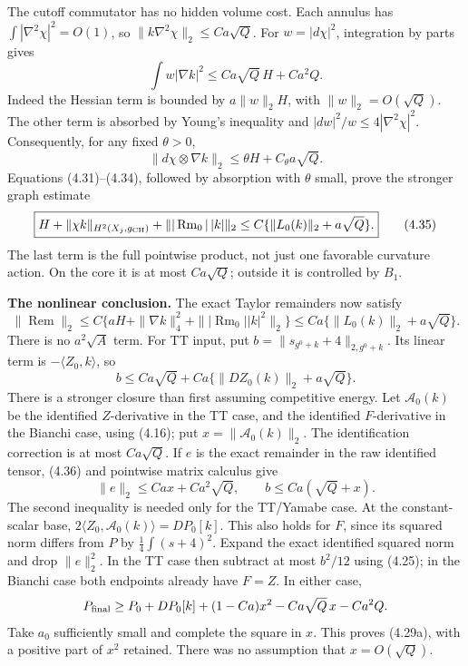 \documentclass[
  11pt,
]{article}
\begin{document}
The cutoff commutator has no hidden volume cost. Each annulus has
\(\int|\nabla^2\chi|^2=O(1)\), so \(\|k\nabla^2\chi\|_2\le Ca\sqrt Q\).
For \(w=|d\chi|^2\), integration by parts gives \[
 \int w|\nabla k|^2
 \le Ca\sqrt Q\,H+Ca^2Q. \tag{4.34}
\] Indeed the Hessian term is bounded by \(a\|w\|_2H\), with
\(\|w\|_2=O(\sqrt Q)\). The other term is absorbed by Young's inequality
and \(|dw|^2/w\le4|\nabla^2\chi|^2\). Consequently, for any fixed
\(\theta>0\), \[
 \|d\chi\otimes\nabla k\|_2
                 \le\theta H+C_\theta a\sqrt Q.
\] Equations (4.31)--(4.34), followed by absorption with \(\theta\)
small, prove the stronger graph estimate \[
 \boxed{H+\|\chi k\|_{H^2(X_j,g_{\rm CH})}
                 +\||\operatorname{Rm}_0|\,|k|\|_2
       \le C\{\|L_0(k)\|_2+a\sqrt Q\}.} \tag{4.35}
\] The last term is the full pointwise product, not just one favorable
curvature action. On the core it is at most \(Ca\sqrt Q\); outside it is
controlled by \(B_1\).

\textbf{The nonlinear conclusion.} The exact Taylor remainders now
satisfy \[
 \|\operatorname{Rem}\|_2
 \le C\{aH+\|\nabla k\|_4^2+
                       \||\operatorname{Rm}_0||k|^2\|_2\}
 \le Ca\{\|L_0(k)\|_2+a\sqrt Q\}. \tag{4.36}
\] There is no \(a^2\sqrt A\) term. For TT input, put
\(b=\|s_{g^0+k}+4\|_{2,g^0+k}\). Its linear term is
\(-\langle Z_0,k\rangle\), so \[
 b\le Ca\sqrt Q+
                  Ca\{\|DZ_0(k)\|_2+a\sqrt Q\}.
\] There is a stronger closure than first assuming competitive energy.
Let \(\mathcal A_0(k)\) be the identified \(Z\)-derivative in the TT
case, and the identified \(F\)-derivative in the Bianchi case, using
(4.16); put \(x=\|\mathcal A_0(k)\|_2\). The identification correction
is at most \(Ca\sqrt Q\). If \(e\) is the exact remainder in the raw
identified tensor, (4.36) and pointwise matrix calculus give \[
 \|e\|_2\le Ca x+Ca^2\sqrt Q,\qquad
 b\le Ca(\sqrt Q+x). \tag{4.37}
\] The second inequality is needed only for the TT/Yamabe case. At the
constant-scalar base, \(2\langle Z_0,\mathcal A_0(k)\rangle=DP_0[k]\).
This also holds for \(F\), since its squared norm differs from \(P\) by
\(\frac14\int(s+4)^2\). Expand the exact identified squared norm and
drop \(\|e\|_2^2\). In the TT case then subtract at most \(b^2/12\)
using (4.25); in the Bianchi case both endpoints already have \(F=Z\).
In either case, \[
 P_{\rm final}
 \ge P_0+DP_0[k]+(1-Ca)x^2-Ca\sqrt Q\,x-Ca^2Q.
\] Take \(a_0\) sufficiently small and complete the square in \(x\).
This proves (4.29a), with a positive part of \(x^2\) retained. There was
no assumption that \(x=O(\sqrt Q)\).
\end{document}
